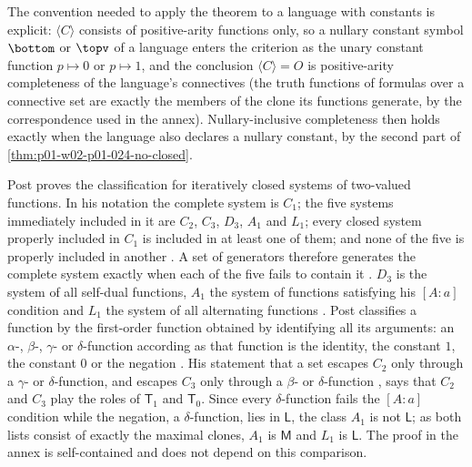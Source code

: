 The convention needed to apply the theorem to a language with constants is
explicit: \(\langle C\rangle\) consists of positive-arity functions only, so
a nullary constant symbol \(\bottom\) or \(\topv\) of a language enters the
criterion as the unary constant function \(p\mapsto0\) or \(p\mapsto1\), and
the conclusion \(\langle C\rangle=O\) is positive-arity completeness of the
language's connectives (the truth functions of formulas over a connective
set are exactly the members of the clone its functions generate, by the
correspondence used in the annex).  Nullary-inclusive completeness then
holds exactly when the language also declares a nullary constant, by the
second part of \cref{thm:p01-w02-p01-024-no-closed}.

Post proves the classification for iteratively closed systems of two-valued
functions.  In his notation the complete system is \(C_1\); the five
systems immediately included in it are \(C_2\), \(C_3\), \(D_3\), \(A_1\)
and \(L_1\); every closed system properly included in \(C_1\) is included
in at least one of them; and none of the five is properly included in
another \cite[\S\,25, p.~99]{Post1941}.  A set of generators therefore
generates the complete system exactly when each of the five fails to
contain it \cite[\S\,26, p.~105]{Post1941}.  \(D_3\) is the system of all
self-dual functions, \(A_1\) the system of functions satisfying his
\([A{:}a]\) condition and \(L_1\) the system of all alternating functions
\cite[\S\,26, p.~106]{Post1941}.  Post classifies a function by the
first-order function obtained by identifying all its arguments: an
\(\alpha\)-, \(\beta\)-, \(\gamma\)- or \(\delta\)-function according as
that function is the identity, the constant \(1\), the constant \(0\) or
the negation \cite[\S\,10, p.~43]{Post1941}.  His statement that a set
escapes \(C_2\) only through a \(\gamma\)- or \(\delta\)-function, and
escapes \(C_3\) only through a \(\beta\)- or \(\delta\)-function
\cite[\S\,26, p.~105]{Post1941}, says that \(C_2\) and \(C_3\) play the
roles of \(\mathsf T_1\) and \(\mathsf T_0\).  Since every
\(\delta\)-function fails the \([A{:}a]\) condition
\cite[\S\,26, p.~106]{Post1941} while the negation, a \(\delta\)-function,
lies in \(\mathsf L\), the class \(A_1\) is not \(\mathsf L\); as both lists
consist of exactly the maximal clones, \(A_1\) is \(\mathsf M\) and \(L_1\)
is \(\mathsf L\).  The proof in the annex is self-contained and does not
depend on this comparison.

